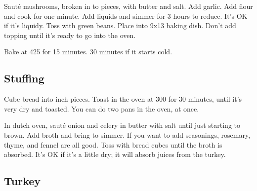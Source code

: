 \begin{recipe}
Sauté mushrooms, broken in to pieces, with butter and salt. Add garlic. Add flour and cook for one minute. Add liquids and simmer for 3 hours to reduce. It's OK if it's liquidy. Toss with green beans. Place into 9x13 baking dish. Don't add topping until it's ready to go into the oven.

Bake at 425\degree{} for 15 minutes. 30 minutes if it starts cold. 

\subsection{Stuffing}



Cube bread into  inch pieces. Toast in the oven at 300\degree{} for 30 minutes, until it's very dry and toasted. You can do two pans in the oven, at once. 



In dutch oven, sauté onion and celery in butter with salt until just starting to brown. Add broth and bring to simmer. If you want to add seasonings, rosemary, thyme, and fennel are all good. Toss with bread cubes until the broth is absorbed. It's OK if it's a little dry; it will absorb juices from the turkey. 

\subsection{Turkey}




\end{recipe}
